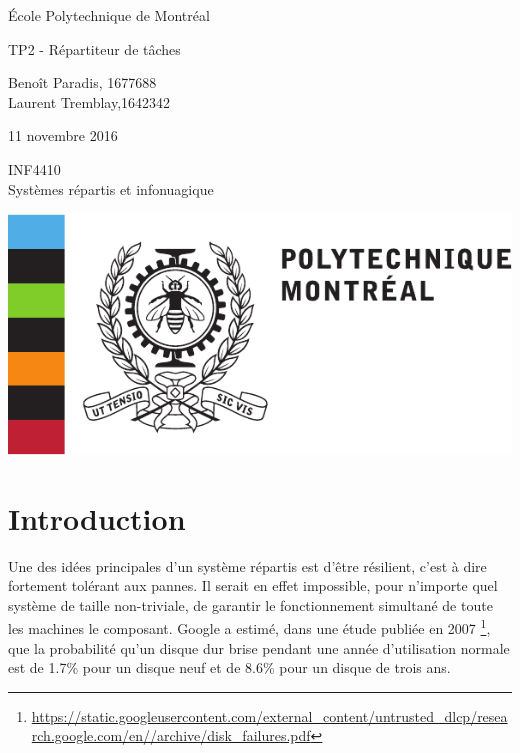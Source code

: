 \thispagestyle{empty}
\begin{center}

{\Large École Polytechnique de Montréal}


\vfill

{\Huge TP2 - Répartiteur de tâches\\}

\vfill

Benoît Paradis,  1677688\\
Laurent Tremblay,1642342 \\ 


\vfill

11 novembre 2016

\vfill

INF4410 \\ 
Systèmes répartis et infonuagique

\vfill

\includegraphics[scale=0.7]{Poly_Logo-eps-converted-to.pdf}

\end{center}
\newpage


\tableofcontents
\newpage


% 

\section{Introduction}

Une des idées principales d'un système répartis est d'être résilient, c'est à dire fortement tolérant aux pannes.
Il serait en effet impossible, pour n'importe quel système de taille non-triviale, de garantir le fonctionnement 
simultané de toute les machines le composant. Google a estimé, dans une étude publiée en 2007 \footnote{\url{https://static.googleusercontent.com/external_content/untrusted_dlcp/research.google.com/en//archive/disk_failures.pdf}}, que la probabilité qu'un disque dur 
brise pendant une année d'utilisation normale est de 1.7\% pour un disque neuf et de 8.6\% pour un disque de trois ans. 

